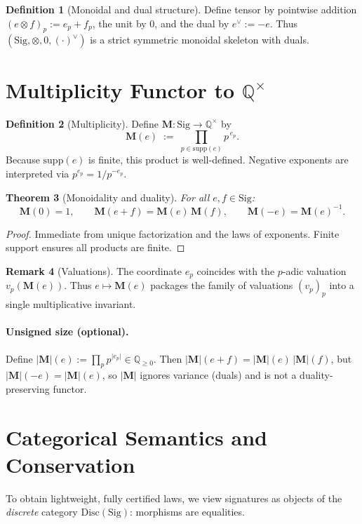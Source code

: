 \documentclass[11pt]{article}
\theoremstyle{plain}
\newtheorem{theorem}{Theorem}[section]
\theoremstyle{definition}
\newtheorem{definition}[theorem]{Definition}
\newtheorem{remark}[theorem]{Remark}
\newcommand{\Q}{\mathbb{Q}}
\newcommand{\Sig}{\mathrm{Sig}}
\newcommand{\supp}{\mathrm{supp}}
\newcommand{\D}{\mathrm{Disc}} %
\newcommand{\M}{\mathbf{M}} %
\newcommand{\Mabs}{\lvert\mathbf{M}\rvert}
\begin{document}
\begin{definition}[Monoidal and dual structure]
Define tensor by pointwise addition $(e\otimes f)_p := e_p+f_p$, the unit by $0$, and the dual by $e^\vee := -e$. Thus $(\Sig,\otimes,0,(\cdot)^\vee)$ is a strict symmetric monoidal skeleton with duals.
\end{definition}

\section{Multiplicity Functor to $\Q^{\times}$}
\label{sec:multiplicity}
\begin{definition}[Multiplicity]
Define $\M:\Sig\to \Q^{\times}$ by
\[
  \M(e)\;:=\; \prod_{p\in\supp(e)} p^{\,e_p}.
\]
Because $\supp(e)$ is finite, this product is well-defined. Negative exponents are interpreted via $p^{e_p}=1/p^{-e_p}$.
\end{definition}

\begin{theorem}[Monoidality and duality]
\label{thm:monoidal}
For all $e,f\in\Sig$:
\[
  \M(0)=1,\qquad \M(e+f)=\M(e)\,\M(f),\qquad \M(-e)=\M(e)^{-1}.
\]
\end{theorem}
\begin{proof}
Immediate from unique factorization and the laws of exponents. Finite support ensures all products are finite.
\end{proof}

\begin{remark}[Valuations]
The coordinate $e_p$ coincides with the $p$-adic valuation $v_p(\M(e))$. Thus $e\mapsto \M(e)$ packages the family of valuations $(v_p)_p$ into a single multiplicative invariant.
\end{remark}

\paragraph{Unsigned size (optional).} Define $\Mabs(e):=\prod_p p^{\lvert e_p\rvert}\in \Q_{\ge 0}$. Then $\Mabs(e+f)=\Mabs(e)\,\Mabs(f)$, but $\Mabs(-e)=\Mabs(e)$, so $\Mabs$ ignores variance (duals) and is not a duality-preserving functor.

\section{Categorical Semantics and Conservation}
\label{sec:category}
To obtain lightweight, fully certified laws, we view signatures as objects of the \emph{discrete} category $\D(\Sig)$: morphisms are equalities.
\end{document}
